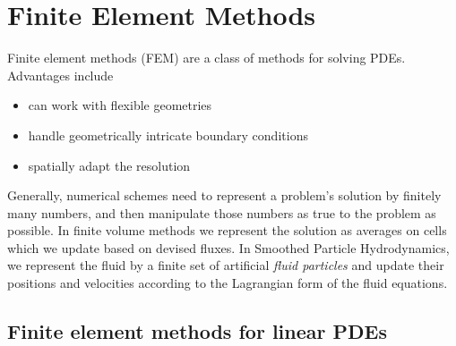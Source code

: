 \section{Finite Element Methods}
\thispagestyle{plain}

Finite element methods (FEM) are a class of methods for solving PDEs. Advantages include
\begin{itemize}
    \item can work with flexible geometries
    \item handle geometrically intricate boundary conditions
    \item spatially adapt the resolution
\end{itemize}

Generally, numerical schemes need to represent a problem's solution by finitely many numbers,
and then manipulate those numbers as true to the problem as possible. In finite volume
methods we represent the solution as averages on cells which we update based on devised fluxes.
In Smoothed Particle Hydrodynamics, we represent the fluid by a finite set of artificial 
\textit{fluid particles} and update their positions and velocities according to the Lagrangian
form of the fluid equations.


\subsection{Finite element methods for linear PDEs}
